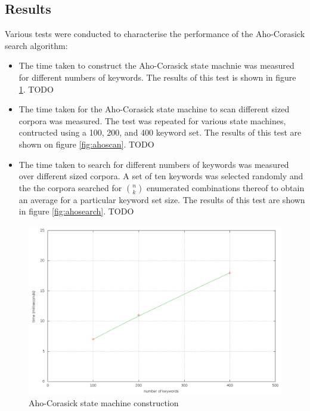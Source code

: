 \documentclass[10pt]{report}
\begin{document}
\subsection*{Results}
Various tests were conducted to characterise the performance of the
Aho-Corasick search algorithm:

\begin{itemize}
\item The time taken to construct the Aho-Corasick state machnie was
  measured for different numbers of keywords. The results of this test
  is shown in figure \ref{fig:ahostatemachine}. TODO

\item The time taken for the Aho-Corasick state machine to scan
  different sized corpora was measured. The test was repeated for
  various state machines, contructed using a 100, 200, and 400 keyword
  set. The results of this test are shown on figure
  \ref{fig:ahoscan}. TODO

\item The time taken to search for different numbers of keywords was
  measured over different sized corpora. A set of ten
  keywords was selected randomly and the the corpora searched for ${n
    \choose k}$ enumerated combinations thereof to obtain an average
  for a particular keyword set size. The results of this test are
  shown in figure \ref{fig:ahosearch}. TODO
\end{itemize}


\begin{figure}
  \begin{center}
	\includegraphics[width=\textwidth,height=!]{ahostatemachine}
  \end{center}
  \caption{Aho-Corasick state machine construction}
  \label{fig:ahostatemachine}
\end{figure} 
\end{document}
